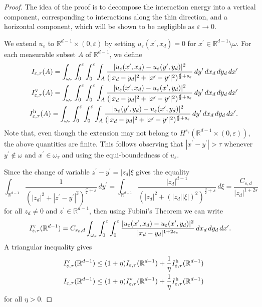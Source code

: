 \documentclass[11pt]{article}
\def\e{\varepsilon}
\begin{document}
\begin{proof} The idea of the proof is to decompose the interaction energy into a vertical
component, corresponding to interactions along the thin direction, and a horizontal
component, which will be shown to be negligible as $\e\to 0$.


We extend $u_\e$ to $\mathbb R^{d-1}\times(0,\e)$ by setting $u_\e(x^\prime,x_d)=0$ for $x^\prime\in\mathbb R^{d-1}\setminus\omega$. 
For each measurable subset $A$ of $\mathbb R^{d-1}$, we define 
\begin{eqnarray*}
&&I_{\e,\tau}(A)= \int_{\omega_\tau}\int_0^\e\int_0^\e\int_A\frac{|u_\e(x^\prime, x_d)-u_\e(y^\prime, y_d)|^2}{(|x_d-y_d|^2+|x^\prime-y^\prime|^2)^{\frac{d}{2}+s_\e}}\, dy^\prime\, dx_d\, dy_d\, dx^\prime\\
&&I^{\rm v}_{\e,\tau}(A)=\int_{\omega_\tau}\int_0^\e\int_0^\e\int_A \frac{|u_\e(x^\prime, x_d)-u_\e(x^\prime, y_d)|^2}{(|x_d-y_d|^2+|x^\prime-y^\prime|^2)^{\frac{d}{2}+s_\e}}\, dy^\prime\, dx_d\, dy_d\, dx^\prime\\ 
&&I^{\rm h}_{\e,\tau}(A)=\int_{\omega_\tau}\int_0^\e\int_0^\e\int_A \frac{|u_\e(y^\prime, y_d)-u_\e(x^\prime, y_d)|^2}{(|x_d-y_d|^2+|x^\prime-y^\prime|^2)^{\frac{d}{2}+s_\e}}\, dy^\prime\, dx_d\, dy_d\, dx^\prime  . 
\end{eqnarray*}
Note that, even though the extension may not belong to $H^{s_\varepsilon}(\mathbb R^{d-1}\times (0,\varepsilon))$, the above quantities are finite. This follows observing that $|x^\prime - y^\prime| > \tau$ whenever $y^\prime \notin \omega$ and $x^\prime \in \omega_\tau$ and using the equi-boundedness of   $u_{\e}$. %

Since the change of variable $z^\prime-y^\prime=|z_d|\xi$ gives the equality 
\begin{equation}
\int_{\mathbb R^{d-1}} \frac{1}{(|z_d|^2+|z^\prime-y^\prime|^2)^{\frac{d}{2}+s}}\, dy^\prime=
\int_{\mathbb R^{d-1}} \frac{|z_d|^{d-1}}{(|z_d|^2+(|z_d||\xi|)^2)^{\frac{d}{2}+s}}\, d\xi
=
\frac{C_{s,d}}{|z_d|^{1+2s}}
\label{rd1}
\end{equation} 
for all $z_d\neq 0$ and $z^\prime\in\mathbb R^{d-1}$,  
then using Fubini's Theorem we can write  
\begin{equation}
I^{\rm v}_{\e,\tau}(\mathbb R^{d-1})=C_{s_\e,d}\int_{\omega_\tau}\int_0^\e\int_0^\e\frac{|u_\e(x^\prime, x_d)-u_\e(x^\prime, y_d)|^2}{|x_d-y_d|^{1+2s_\e}}\, dx_d\, dy_d\, dx^\prime.\label{cvar}
\end{equation}
A triangular inequality gives 
\begin{eqnarray}
&&I_{\e,\tau}^{\rm v}(\mathbb R^{d-1})\leq (1+\eta)I_{\e,\tau}(\mathbb R^{d-1})+\frac{1}{\eta}I_{\e,\tau}^{\rm h}(\mathbb R^{d-1})\label{tr1}\\
&&I_{\e,\tau}(\mathbb R^{d-1})\leq (1+\eta)I_{\e,\tau}^{\rm v}(\mathbb R^{d-1})+\frac{1}{\eta}I_{\e,\tau}^{\rm h}(\mathbb R^{d-1})\label{tr2}
\end{eqnarray}
for all $\eta>0$. 


\end{proof}
\end{document}
